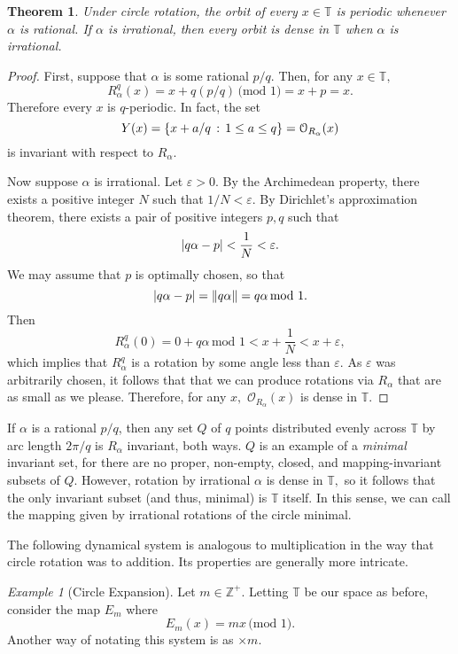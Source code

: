 \documentclass[12pt, letterpaper, oneside]{book}
\newcommand{\ga}{\ensuremath{\alpha}}
\renewcommand{\ge}{\ensuremath{\varepsilon}}
\newcommand{\Z}{\mathbb{Z}}
\newcommand{\T}{\mathbb{T}}
\DeclarePairedDelimiter{\abs}{\lvert}{\rvert}
\DeclarePairedDelimiter{\norm}{\lVert}{\rVert}
\DeclarePairedDelimiter{\set}{\lbrace}{\rbrace}
\theoremstyle{plain}
\newtheorem{theorem}{Theorem}
\theoremstyle{definition}
\theoremstyle{remark}
\newtheorem{example}{Example}
\begin{document}
\begin{theorem}
Under circle rotation, the orbit of every $x\in \T$ is periodic whenever $\ga$ is rational. If $\ga$ is irrational, then every orbit is dense in $\T$ when $\ga$ is irrational.
\end{theorem}

\begin{proof}
First, suppose that $\ga$ is some rational $p/q.$ Then, for any $x \in \T,$ 
\[
R_\ga ^q(x) = x + q(p/q) \, \mbox{(mod 1)} = x + p = x.
\]
Therefore every $x$ is $q$-periodic. In fact, the set 
\[
Y(x) = \set{x + a/q\,:\,1\leq a \leq q} = \mathcal{O}_{R_\ga}(x)
\]
is invariant with respect to $R_\ga.$

Now suppose $\ga$ is irrational. Let $\ge > 0.$ By the Archimedean property, there exists a positive integer $N$ such that $1/N < \ge.$ By Dirichlet's approximation theorem, there exists a pair of positive integers $p,q$ such that 
\[
\abs{q\ga - p} < \frac{1}{N} < \ge.
\]
We may assume that $p$ is optimally chosen, so that
\[
\abs{q\ga -p} = \norm{q\ga} = q\ga \, \mbox{mod 1}.
\]
Then
\[
R_\ga ^ q (0) = 0+ q\ga \, \mbox{mod 1} < x + \frac{1}{N} < x + \ge,
\]
which implies that $R_\ga ^q$ is a rotation by some angle less than $\ge.$ As $\ge$ was arbitrarily chosen, it follows that that we can produce rotations via $R_\ga$ that are as small as we please. Therefore, for any $x,$ $\mathcal{O}_{R_\ga}(x)$ is dense in $\T.$
\end{proof}

 If $\ga$ is a rational $p/q$, then any set $Q$ of $q$ points distributed evenly across $\T$ by arc length $2\pi/q$ is $R_\ga$ invariant, both ways. $Q$ is an example of a \textit{minimal} invariant set, for there are no proper, non-empty, closed, and mapping-invariant subsets of $Q.$ However, rotation by irrational $\ga$ is dense in $\T,$ so it follows that the only invariant subset (and thus, minimal) is $\T$ itself. In this sense, we can call the mapping given by irrational rotations of the circle minimal.

The following dynamical system is analogous to multiplication in the way that circle rotation was to addition. Its properties are generally more intricate.

\begin{example}[Circle Expansion]
Let $m \in \Z^+.$ Letting $\T$ be our space as before, consider the map $E_m$ where
\[
E_m(x) = mx \,\mbox{(mod 1)}.
\]
Another way of notating this system is as $\times m.$ 
\end{example}
\end{document}
